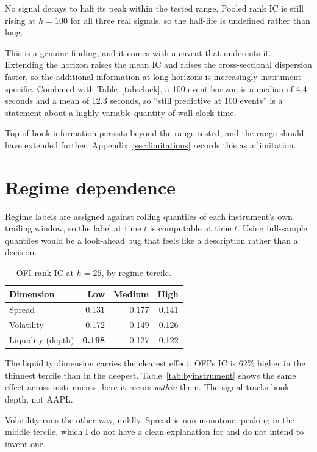 \documentclass[11pt]{scrartcl}
\begin{document}
No signal decays to half its peak within the tested range. Pooled rank IC is still rising at $h=100$ for all three real signals, so the half-life is undefined rather than long.

This is a genuine finding, and it comes with a caveat that undercuts it. Extending the horizon raises the mean IC and raises the cross-sectional dispersion faster, so the additional information at long horizons is increasingly instrument-specific. Combined with Table~\ref{tab:clock}, a 100-event horizon is a median of 4.4 seconds and a mean of 12.3 seconds, so ``still predictive at 100 events'' is a statement about a highly variable quantity of wall-clock time.

Top-of-book information persists beyond the range tested, and the range should have extended further. Appendix~\ref{sec:limitations} records this as a limitation.

\section{Regime dependence}
\label{sec:regimes}

Regime labels are assigned against rolling quantiles of each instrument's own trailing window, so the label at time $t$ is computable at time $t$. Using full-sample quantiles would be a look-ahead bug that feels like a description rather than a decision.

\begin{table}[H]
\centering
\caption{OFI rank IC at $h=25$, by regime tercile.}
\label{tab:regimes}
\begin{tabular}{lrrr}
\toprule
Dimension & Low & Medium & High \\
\midrule
Spread            & 0.131 & 0.177 & 0.141 \\
Volatility        & 0.172 & 0.149 & 0.126 \\
Liquidity (depth) & \textbf{0.198} & 0.127 & 0.122 \\
\bottomrule
\end{tabular}
\end{table}

The liquidity dimension carries the clearest effect: OFI's IC is 62\% higher in the thinnest tercile than in the deepest. Table~\ref{tab:byinstrument} shows the same effect across instruments; here it recurs \emph{within} them. The signal tracks book depth, not AAPL.

Volatility runs the other way, mildly. Spread is non-monotone, peaking in the middle tercile, which I do not have a clean explanation for and do not intend to invent one.
\end{document}
